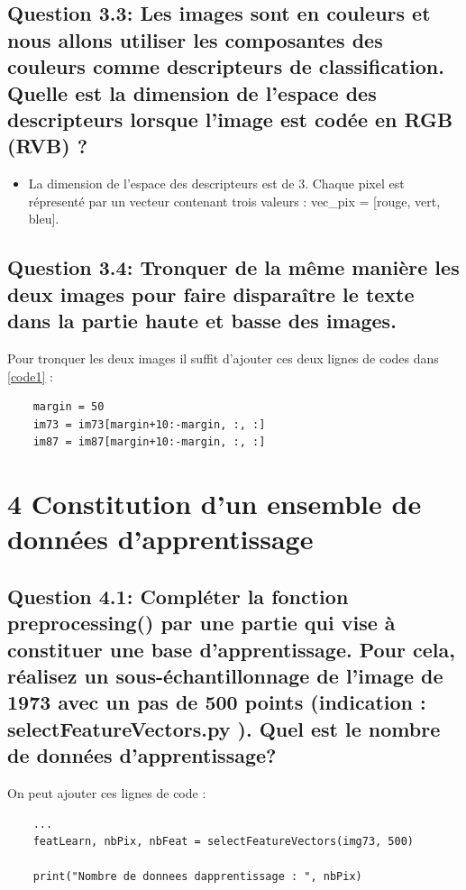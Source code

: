 \subsection*{Question 3.3: Les images sont en couleurs et nous allons utiliser les composantes des couleurs comme
descripteurs de classification. Quelle est la dimension de l’espace des descripteurs lorsque l’image
est codée en RGB (RVB) ?}
\begin{itemize}
    \item La dimension de l'espace des descripteurs est de 3. Chaque pixel est répresenté par un vecteur contenant trois valeurs : vec\_pix = [rouge, vert, bleu].
\end{itemize}

\subsection*{Question 3.4: Tronquer de la même manière les deux images pour faire disparaître le texte dans la
partie haute et basse des images.}

Pour tronquer les deux images il suffit d'ajouter ces deux lignes de codes dans \ref{code1} :

\begin{lstlisting}
    margin = 50 
    im73 = im73[margin+10:-margin, :, :]
    im87 = im87[margin+10:-margin, :, :]
\end{lstlisting}

\section*{4 Constitution d’un ensemble de données d’apprentissage}
\subsection*{Question 4.1: Compléter la fonction
preprocessing() par une partie qui vise à constituer une base
d’apprentissage. Pour cela, réalisez un sous-échantillonnage de l’image de 1973 avec un pas de 500
points (indication :
selectFeatureVectors.py ). Quel est le nombre de données d’apprentissage?}

On peut ajouter ces lignes de code :

\begin{lstlisting}
    ...
    featLearn, nbPix, nbFeat = selectFeatureVectors(img73, 500)

    print("Nombre de donnees dapprentissage : ", nbPix)
    
\end{lstlisting}

